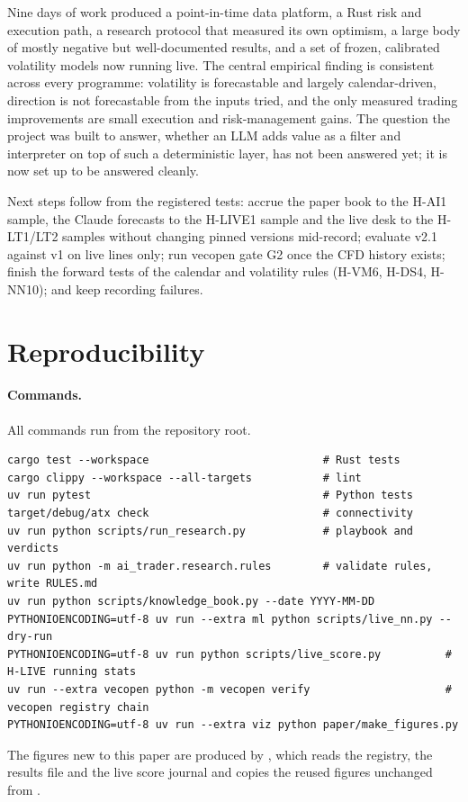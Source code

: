\documentclass[10pt,a4paper]{article}
\newcommand{\hyp}[1]{\textsf{#1}}
\begin{document}
Nine days of work produced a point-in-time data platform, a Rust risk and execution path, a research protocol that measured its own optimism, a large body of mostly negative but well-documented results, and a set of frozen, calibrated volatility models now running live. The central empirical finding is consistent across every programme: volatility is forecastable and largely calendar-driven, direction is not forecastable from the inputs tried, and the only measured trading improvements are small execution and risk-management gains. The question the project was built to answer, whether an LLM adds value as a filter and interpreter on top of such a deterministic layer, has not been answered yet; it is now set up to be answered cleanly.

Next steps follow from the registered tests: accrue the paper book to the \hyp{H-AI1} sample, the Claude forecasts to the \hyp{H-LIVE1} sample and the live desk to the \hyp{H-LT1/LT2} samples without changing pinned versions mid-record; evaluate v2.1 against v1 on live lines only; run vecopen gate G2 once the CFD history exists; finish the forward tests of the calendar and volatility rules (\hyp{H-VM6}, \hyp{H-DS4}, \hyp{H-NN10}); and keep recording failures.

\FloatBarrier



\appendix
\section{Reproducibility}

\paragraph{Commands.} All commands run from the repository root.
{\small
\begin{verbatim}
cargo test --workspace                           # Rust tests
cargo clippy --workspace --all-targets           # lint
uv run pytest                                    # Python tests
target/debug/atx check                           # connectivity
uv run python scripts/run_research.py            # playbook and verdicts
uv run python -m ai_trader.research.rules        # validate rules, write RULES.md
uv run python scripts/knowledge_book.py --date YYYY-MM-DD
PYTHONIOENCODING=utf-8 uv run --extra ml python scripts/live_nn.py --dry-run
PYTHONIOENCODING=utf-8 uv run python scripts/live_score.py          # H-LIVE running stats
uv run --extra vecopen python -m vecopen verify                     # vecopen registry chain
PYTHONIOENCODING=utf-8 uv run --extra viz python paper/make_figures.py
\end{verbatim}
}
The figures new to this paper are produced by \protect{}, which reads the registry, the results file and the live score journal and copies the reused figures unchanged from \protect{}.
\end{document}
